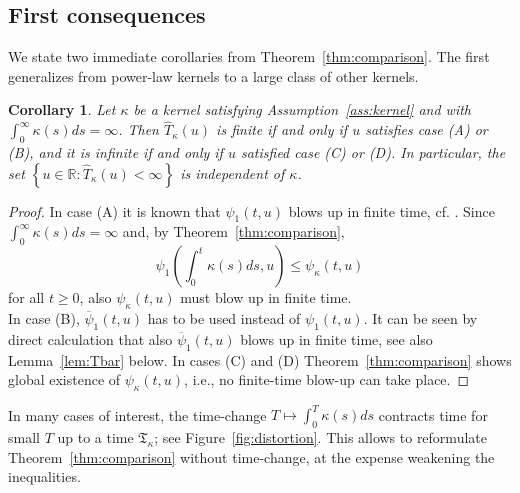 \documentclass[12pt,a4paper]{amsart}
\numberwithin{equation}{section}
\numberwithin{equation}{section}
\newtheorem{corollary}[theorem]{Corollary}
\theoremstyle{nonumberplain}
\newcommand{\RR}{\mathbb{R}}
\newcommand{\set}[1]{\left\{#1\right\}}
\begin{document}
\subsection{First consequences}
We state two immediate corollaries from Theorem~\ref{thm:comparison}. The first generalizes \cite[Thm.~2.4]{gerhold2018moment} from power-law kernels  to a large class of other kernels.
\begin{corollary}Let $\kappa$ be a kernel satisfying Assumption~\ref{ass:kernel} and with $\int_0^\infty \kappa(s)ds = \infty$. Then $\hat{T}_\kappa(u)$ is finite if and only if $u$ satisfies case (A) or (B), and it is infinite if and only if $u$ satisfied case (C) or (D). In particular, the set $\set{u \in \RR: \hat{T}_\kappa(u) < \infty}$ is independent of $\kappa$.
\end{corollary}
\begin{proof}In case (A) it is known that $\psi_1(t,u)$ blows up in finite time, cf. \cite{andersen2007moment, keller-ressel2011moment}. Since $\int_0^\infty \kappa(s) ds = \infty$ and, by Theorem~\ref{thm:comparison}, 
\[\psi_1\left(\int_0^t \kappa(s) ds, u \right) \le \psi_\kappa(t,u)\]
for all $t \ge 0$, also $\psi_\kappa(t,u)$ must blow up in finite time.\\
In case (B), $\overline \psi_1(t,u)$ has to be used instead of $\psi_1(t,u)$. It can be seen by direct calculation that also $\overline \psi_1(t,u)$ blows up in finite time, see also Lemma~\ref{lem:Tbar} below. In cases (C) and (D) Theorem~\ref{thm:comparison} shows global existence of $\psi_\kappa(t,u)$, i.e., no finite-time blow-up can take place.
\end{proof}
In many cases of interest, the time-change $T \mapsto \int_0^T \kappa(s)ds$ contracts time for small $T$ up to a time $\mathfrak{T}_\kappa$; see  Figure~\ref{fig:distortion}. This allows to reformulate Theorem~\ref{thm:comparison} without time-change, at the expense weakening the inequalities.
\end{document}
